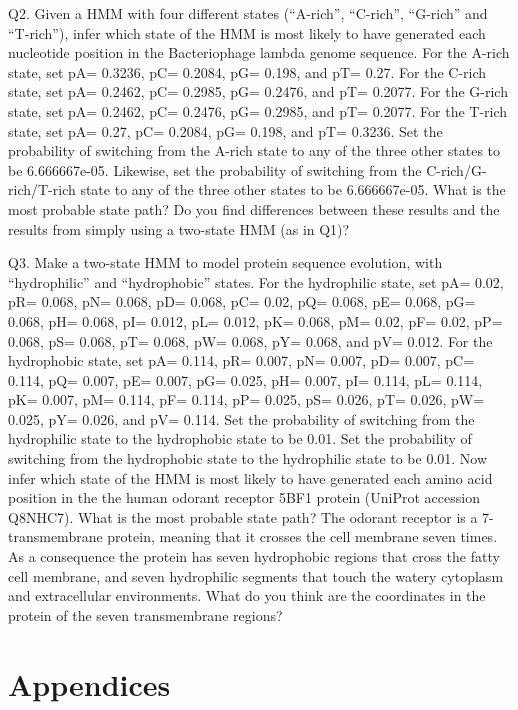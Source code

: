 \documentclass[
]{book}
\begin{document}
Q2. Given a HMM with four different states (``A-rich'', ``C-rich'', ``G-rich'' and ``T-rich''), infer which state of
the HMM is most likely to have generated each nucleotide position in the Bacteriophage lambda genome sequence. For the A-rich state, set pA= 0.3236, pC= 0.2084, pG= 0.198, and pT= 0.27. For the C-rich state, set pA= 0.2462, pC= 0.2985, pG= 0.2476, and pT= 0.2077. For the G-rich state, set pA= 0.2462, pC= 0.2476, pG= 0.2985, and pT= 0.2077. For the T-rich state, set pA= 0.27, pC= 0.2084, pG= 0.198, and pT= 0.3236. Set the probability of switching from the A-rich state to any of the three other states to be 6.666667e-05. Likewise, set the probability of switching from the C-rich/G-rich/T-rich state to any of the three other states to be 6.666667e-05. What is the most probable state path? Do you find differences between these results and the results from simply using a two-state HMM (as in Q1)?

Q3. Make a two-state HMM to model protein sequence evolution, with ``hydrophilic'' and ``hydrophobic'' states.
For the hydrophilic state, set pA= 0.02, pR= 0.068, pN= 0.068, pD= 0.068, pC= 0.02, pQ= 0.068, pE= 0.068, pG= 0.068, pH= 0.068, pI= 0.012, pL= 0.012, pK= 0.068, pM= 0.02, pF= 0.02, pP= 0.068, pS= 0.068, pT= 0.068, pW= 0.068, pY= 0.068, and pV= 0.012. For the hydrophobic state, set pA= 0.114, pR= 0.007, pN= 0.007, pD= 0.007, pC= 0.114, pQ= 0.007, pE= 0.007, pG= 0.025, pH= 0.007, pI= 0.114, pL= 0.114, pK= 0.007, pM= 0.114, pF= 0.114, pP= 0.025, pS= 0.026, pT= 0.026, pW= 0.025, pY= 0.026, and pV= 0.114. Set the probability of switching from the hydrophilic state to the hydrophobic state to be 0.01. Set the probability of switching from the hydrophobic state to the hydrophilic state to be 0.01. Now infer which state of the HMM is most likely to have generated each amino acid position in the the human odorant receptor 5BF1 protein (UniProt accession Q8NHC7). What is the most probable state path? The odorant receptor is a 7-transmembrane protein, meaning that it crosses the cell membrane seven times. As a consequence the protein has seven hydrophobic regions that cross the fatty cell membrane, and seven hydrophilic segments that touch the watery cytoplasm and extracellular environments. What do you think are the coordinates in the protein of the seven transmembrane regions?

\hypertarget{part-appendices}{%
\part{Appendices}\label{part-appendices}}
\end{document}
